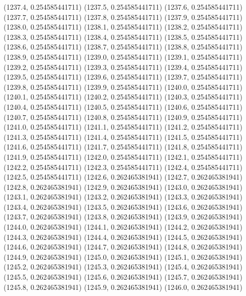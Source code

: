 {					(1237.4, 0.254585441711)
					(1237.5, 0.254585441711)
					(1237.6, 0.254585441711)
					(1237.7, 0.254585441711)
					(1237.8, 0.254585441711)
					(1237.9, 0.254585441711)
					(1238.0, 0.254585441711)
					(1238.1, 0.254585441711)
					(1238.2, 0.254585441711)
					(1238.3, 0.254585441711)
					(1238.4, 0.254585441711)
					(1238.5, 0.254585441711)
					(1238.6, 0.254585441711)
					(1238.7, 0.254585441711)
					(1238.8, 0.254585441711)
					(1238.9, 0.254585441711)
					(1239.0, 0.254585441711)
					(1239.1, 0.254585441711)
					(1239.2, 0.254585441711)
					(1239.3, 0.254585441711)
					(1239.4, 0.254585441711)
					(1239.5, 0.254585441711)
					(1239.6, 0.254585441711)
					(1239.7, 0.254585441711)
					(1239.8, 0.254585441711)
					(1239.9, 0.254585441711)
					(1240.0, 0.254585441711)
					(1240.1, 0.254585441711)
					(1240.2, 0.254585441711)
					(1240.3, 0.254585441711)
					(1240.4, 0.254585441711)
					(1240.5, 0.254585441711)
					(1240.6, 0.254585441711)
					(1240.7, 0.254585441711)
					(1240.8, 0.254585441711)
					(1240.9, 0.254585441711)
					(1241.0, 0.254585441711)
					(1241.1, 0.254585441711)
					(1241.2, 0.254585441711)
					(1241.3, 0.254585441711)
					(1241.4, 0.254585441711)
					(1241.5, 0.254585441711)
					(1241.6, 0.254585441711)
					(1241.7, 0.254585441711)
					(1241.8, 0.254585441711)
					(1241.9, 0.254585441711)
					(1242.0, 0.254585441711)
					(1242.1, 0.254585441711)
					(1242.2, 0.254585441711)
					(1242.3, 0.254585441711)
					(1242.4, 0.254585441711)
					(1242.5, 0.254585441711)
					(1242.6, 0.262465381941)
					(1242.7, 0.262465381941)
					(1242.8, 0.262465381941)
					(1242.9, 0.262465381941)
					(1243.0, 0.262465381941)
					(1243.1, 0.262465381941)
					(1243.2, 0.262465381941)
					(1243.3, 0.262465381941)
					(1243.4, 0.262465381941)
					(1243.5, 0.262465381941)
					(1243.6, 0.262465381941)
					(1243.7, 0.262465381941)
					(1243.8, 0.262465381941)
					(1243.9, 0.262465381941)
					(1244.0, 0.262465381941)
					(1244.1, 0.262465381941)
					(1244.2, 0.262465381941)
					(1244.3, 0.262465381941)
					(1244.4, 0.262465381941)
					(1244.5, 0.262465381941)
					(1244.6, 0.262465381941)
					(1244.7, 0.262465381941)
					(1244.8, 0.262465381941)
					(1244.9, 0.262465381941)
					(1245.0, 0.262465381941)
					(1245.1, 0.262465381941)
					(1245.2, 0.262465381941)
					(1245.3, 0.262465381941)
					(1245.4, 0.262465381941)
					(1245.5, 0.262465381941)
					(1245.6, 0.262465381941)
					(1245.7, 0.262465381941)
					(1245.8, 0.262465381941)
					(1245.9, 0.262465381941)
					(1246.0, 0.262465381941)
}
